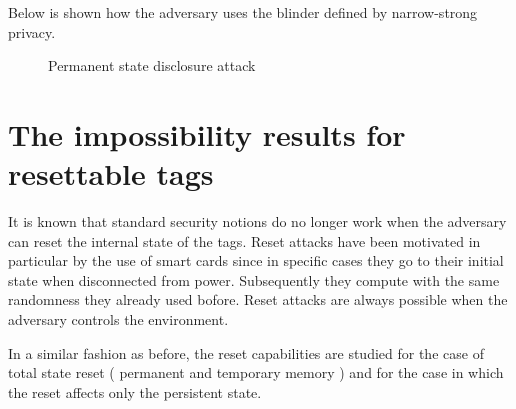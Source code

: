     Below is shown how the adversary uses the blinder defined by narrow-strong privacy.

    \begin{figure}[h!]
        
    \hspace*{2cm}
    \caption{Permanent state disclosure attack}
    \end{figure}

\section{The impossibility results for resettable tags}

    It is known that standard security notions do no longer work when the adversary can reset the internal state of the tags. Reset attacks have
    been motivated in particular by the use of smart cards since in specific cases they go to their initial state when disconnected from power. Subsequently
    they compute with the same randomness they already used bofore. Reset attacks are always possible when the adversary controls the environment.

    In a similar fashion as before, the reset capabilities are studied for the case of total state reset ( permanent and temporary memory ) and for the case in which
    the reset affects only the persistent state.

